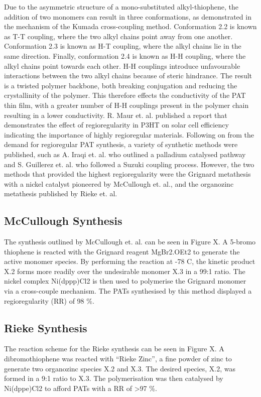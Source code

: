 Due to the asymmetric structure of a mono-substituted alkyl-thiophene, the addition of two monomers can result in three conformations, as demonstrated in the mechanism of the Kumada cross-coupling method. Conformation 2.2 is known as T-T coupling, where the two alkyl chains point away from one another. Conformation 2.3 is known as H-T coupling, where the alkyl chains lie in the same direction. Finally, conformation 2.4 is known as H-H coupling, where the alkyl chains point towards each other. H-H couplings introduce unfavourable interactions between the two alkyl chains because of steric hindrance. The result is a twisted polymer backbone, both breaking conjugation and reducing the crystallinity of the polymer. This therefore effects the conductivity of the PAT thin film, with a greater number of H-H couplings present in the polymer chain resulting in a lower conductivity. R. Maur et. al. published a report that demonstrates the effect of regioregularity in P3HT on solar cell efficiency indicating the importance of highly regioregular materials. 
Following on from the demand for regioregular PAT synthesis, a variety of synthetic methods were published, such as A. Iraqi et. al. who outlined a palladium catalysed pathway and S. Guillerez et. al. who followed a Suzuki coupling process. However, the two methods that provided the highest regioregularity were the Grignard metathesis with a nickel catalyst pioneered by McCullough et. al., and the organozinc metathesis published by Rieke et. al.

\subsection{McCullough Synthesis}

The synthesis outlined by McCullough et. al. can be seen in Figure X. A 5-bromo thiophene is reacted with the Grignard reagent MgBr2.OEt2 to generate the active monomer species. By performing the reaction at -78 C, the kinetic product X.2 forms more readily over the undesirable monomer X.3 in a 99:1 ratio. The nickel complex Ni(dppp)Cl2 is then used to polymerise the Grignard monomer via a cross-couple mechanism. The PATs synthesised by this method displayed a regioregularity (RR) of 98 \%.

\subsection{Rieke Synthesis}

The reaction scheme for the Rieke synthesis can be seen in Figure X. A dibromothiophene was reacted with “Rieke Zinc”, a fine powder of zinc to generate two organozinc species X.2 and X.3. The desired species, X.2, was formed in a 9:1 ratio to X.3. The polymerisation was then catalysed by Ni(dppe)Cl2 to afford PATs with a RR of >97 \%.

